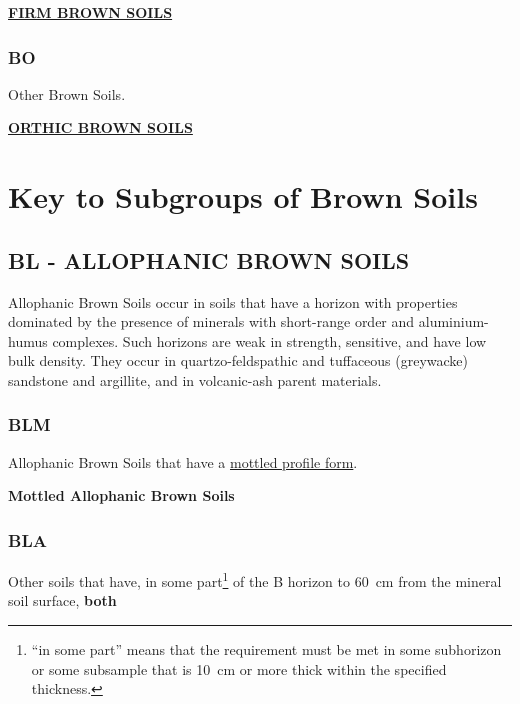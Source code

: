 \documentclass[
  letterpaper,
  DIV=11,
  numbers=noendperiod]{scrreprt}
\begin{document}
\protect\hyperlink{sec-BF}{\textbf{FIRM BROWN SOILS}}

\hypertarget{sec-key-BO}{%
\subsubsection{\texorpdfstring{\textbf{BO}}{BO}}\label{sec-key-BO}}

Other Brown Soils.

\protect\hyperlink{sec-BO}{\textbf{ORTHIC BROWN SOILS}}

\hypertarget{sec-sub-B}{%
\section{Key to Subgroups of Brown Soils}\label{sec-sub-B}}

\hypertarget{sec-BL}{%
\subsection{\texorpdfstring{\textbf{BL} - ALLOPHANIC BROWN
SOILS}{BL - ALLOPHANIC BROWN SOILS}}\label{sec-BL}}

Allophanic Brown Soils occur in soils that have a horizon with
properties dominated by the presence of minerals with short-range order
and aluminium-humus complexes. Such horizons are weak in strength,
sensitive, and have low bulk density. They occur in quartzo-feldspathic
and tuffaceous (greywacke) sandstone and argillite, and in volcanic-ash
parent materials.

\hypertarget{sec-key-BLM}{%
\subsubsection{\texorpdfstring{\textbf{BLM}}{BLM}}\label{sec-key-BLM}}

Allophanic Brown Soils that have a
\protect\hyperlink{sec-diag-mottpf}{mottled profile form}.

\textbf{Mottled Allophanic Brown Soils}

\hypertarget{sec-key-BLA}{%
\subsubsection{\texorpdfstring{\textbf{BLA}}{BLA}}\label{sec-key-BLA}}

Other soils that have, in some part\footnote{``in some part'' means that
  the requirement must be met in some subhorizon or some subsample that
  is 10~cm or more thick within the specified thickness.} of the B
horizon to 60~cm from the mineral soil surface, \textbf{both}
\end{document}
